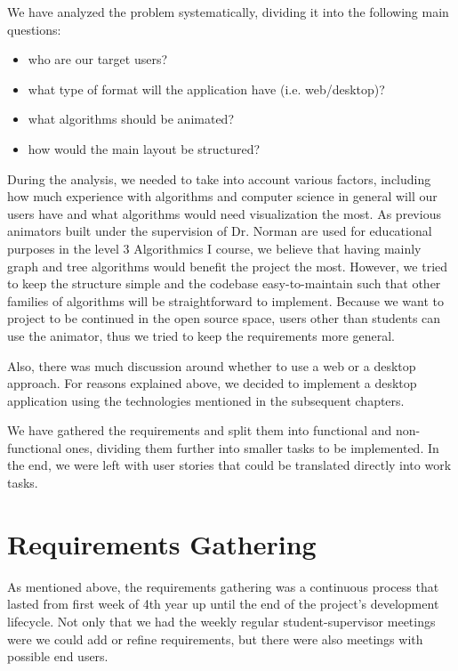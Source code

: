 \documentclass{l4proj}
\begin{document}
We have analyzed the problem systematically, dividing it into the following main questions:

\begin{itemize}
\item who are our target users?
\item what type of format will the application have (i.e. web/desktop)?
\item what algorithms should be animated?
\item how would the main layout be structured?
\end{itemize}

During the analysis, we needed to take into account various factors, including how much experience with algorithms and
computer science in general will our users have and what algorithms would need visualization the most. As previous animators built under the supervision of Dr. Norman are used for educational purposes in the level 3 Algorithmics I course, we believe that having mainly graph and tree algorithms would benefit the project the most. However, we tried to keep the structure simple and the codebase easy-to-maintain such that other families of algorithms will be straightforward to implement. Because we want to project to be continued in the open source space, users other than students can use the animator, thus we tried to keep the requirements more general.

Also, there was much discussion around whether to use a web or a desktop approach. For reasons explained above, we
decided to implement a desktop application using the technologies mentioned in the subsequent chapters.

We have gathered the requirements and split them into functional and non-functional ones, dividing them further into
smaller tasks to be implemented. In the end, we were left with user stories that could be translated directly into work tasks.

\section{Requirements Gathering}

As mentioned above, the requirements gathering was a continuous process that lasted from first week of 4th year up until the end of the project's development lifecycle. Not only that we had the weekly regular student-supervisor meetings were we could add or refine requirements, but there were also meetings with possible end users.
\end{document}
